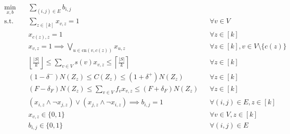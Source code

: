 \documentclass{article}
\begin{document}
\begin{align}
\min_{x, b} \quad & \sum_{(i,j)\in E} b_{i,j} \label{cp:obj} \\
\textrm{s.t.} \quad & \sum_{z \in [k]} x_{v,z} = 1 && \forall v \in V \label{cp:assignment} \\
& x_{c(z), z} = 1 && \forall z \in [k] \label{cp:centroid} \\
& x_{v,z} = 1 \implies \bigvee_{u \in \text{cn}(v, c(z))} x_{u,z} && \forall z \in [k], v \in V \setminus \{c(z)\} \label{cp:contiguity} \\
& \left\lfloor \frac{|S|}{k} \right\rfloor \leq \sum_{v \in V} s(v) x_{v,z} \leq \left\lceil \frac{|S|}{k} \right\rceil && \forall z \in [k] \label{cp:schools} \\
& (1-\delta^{-}) N(Z_z) \leq C(Z_z) \leq (1+\delta^{+}) N(Z_z) && \forall z \in [k] \label{cp:capacity} \\
& (F-\delta_F) N(Z_z) \leq \sum_{v \in V} f_v x_{v,z} \leq (F+\delta_F) N(Z_z) && \forall z \in [k] \label{cp:frl} \\
& (x_{i,z} \land \neg x_{j,z}) \lor (x_{j,z} \land \neg x_{i,z}) \implies b_{i,j} = 1 && \forall (i,j) \in E, z \in [k] \label{cp:cut} \\
& x_{v,z} \in \{0, 1\} && \forall v \in V, z \in [k] \label{cp:x_domain} \\
& b_{i,j} \in \{0, 1\} && \forall (i,j) \in E \label{cp:b_domain}
\end{align}
\end{document}
